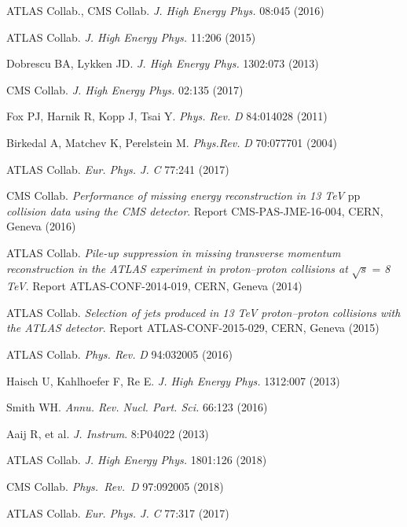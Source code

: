 \documentclass{ar-1col}
\begin{document}
{\begin{thebibliography}{175}
{ATLAS Collab., CMS Collab}. \textit{J. High Energy Phys.} 08:045 (2016)

{ATLAS Collab.} \textit{J. High Energy Phys.} 11:206 (2015)

Dobrescu BA, Lykken JD. \textit{J. High Energy Phys.} 1302:073 (2013)

{CMS Collab}. \textit{J. High Energy Phys.} 02:135 (2017)

Fox PJ, Harnik R, Kopp J, Tsai Y. \textit{Phys. Rev.} \textit{D} 84:014028
(2011)

Birkedal A, Matchev K, Perelstein M. \textit{Phys.Rev.} \textit{D} 70:077701
(2004)

{ATLAS Collab.} \textit{Eur. Phys. J.} \textit{C} 77:241 (2017)

{CMS Collab}. \textit{Performance of missing energy reconstruction in 13 TeV }pp \textit{collision data using the CMS detector}.
Report CMS-PAS-JME-16-004, CERN, Geneva (2016)

ATLAS Collab. \textit{Pile-up suppression in missing transverse momentum reconstruction in the ATLAS experiment in proton--proton collisions at} $\sqrt{s}$ = \textit{8 TeV}. Report ATLAS-CONF-2014-019, CERN, Geneva (2014)

ATLAS Collab. \textit{Selection of jets produced in 13 TeV proton--proton collisions with the ATLAS detector}.
Report ATLAS-CONF-2015-029, CERN, Geneva (2015)

{ATLAS Collab.} \textit{Phys. Rev.} \textit{D} 94:032005 (2016)

Haisch U, Kahlhoefer F, Re E. \textit{J. High Energy Phys.} 1312:007 (2013)

Smith WH. \textit{Annu. Rev. Nucl. Part. Sci.} 66:123 (2016)


Aaij R, {et al.} \textit{J. Instrum}. {8}:P04022 (2013)

{ATLAS Collab.} \textit{J. High Energy Phys.} {1801}:126 (2018)

{CMS Collab.} \textit{Phys.\ Rev.\ D} {97}:092005 (2018)

{ATLAS Collab}.  \textit{Eur. Phys. J.} \textit{C} 77:317 (2017)


\end{thebibliography}}
\end{document}
